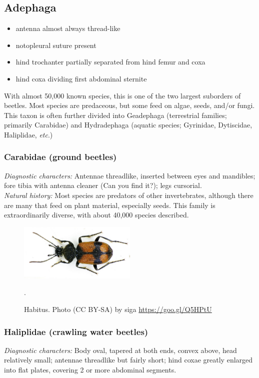 \documentclass[letterpaper, 11pt]{article}
\begin{document}
\subsection{Adephaga}
\begin{itemize}
\item antenna almost always thread-like
\item notopleural suture present 
\item hind trochanter partially separated from hind femur and coxa %
\item hind coxa dividing first abdominal sternite
\end{itemize}
With almost 50,000 known species, this is one of the two largest suborders of beetles. Most species are predaceous, but some feed on algae, seeds, and/or fungi. This taxon is often further divided into Geadephaga (terrestrial families; primarily Carabidae) and Hydradephaga (aquatic species; Gyrinidae, Dytiscidae, Haliplidae, \textit{etc}.) 

\subsubsection{Carabidae (ground beetles)} 
\noindent{}\textit{Diagnostic characters:} Antennae threadlike, inserted between eyes and mandibles; fore tibia with antenna cleaner (Can you find it?); legs cursorial.\\

\noindent{}\textit{Natural history:} Most species are predators of other invertebrates, although there are many that feed on plant material, especially seeds. This family is extraordinarily diverse, with about 40,000 species described.

\begin{figure}[ht!]
  \centering
    \includegraphics[width=0.5\textwidth]{CarabidHabitus}
  \caption{Habitus. Photo (CC BY-SA) by siga \url{https://goo.gl/Q5HPtU}}.
  \label{fig:carab2}
\end{figure}

\subsubsection{Haliplidae (crawling water beetles)}
\noindent{}\textit{Diagnostic characters:} Body oval, tapered at both ends, convex above, head relatively small; antennae threadlike but fairly short; hind coxae greatly enlarged into flat plates, covering 2 or more abdominal segments.\\
\end{document}
